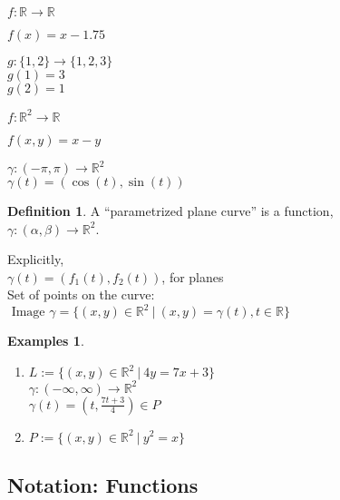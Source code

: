\documentclass[twocolumn,20pt,fleqn]{extarticle}
\newcommand{\sep}{\vspace{0.5cm}}
\theoremstyle{plain}
\theoremstyle{definition}
\newtheorem*{definition}{Definition}
\newtheorem*{exmpls}{Examples}
\theoremstyle{remark}
\newenvironment*{examples}{\begin{exmpls} ~ \begin{enumerate}}{\end{enumerate}\end{exmpls}}
\begin{document}
$ f: \mathbb{R}  \to \mathbb{R}$

$f(x) = x - 1.75$\\

\sep

  $g : \{1,2\} \to \{1,2,3\}$\\
    $g(1) = 3$\\
    $g(2) = 1$\\

\sep

$ f: \mathbb{R}^2  \to \mathbb{R}$

$f(  x,y  ) = x - y$


\sep

$\gamma :  (-\pi,\pi)  \to \mathbb{R}^2$\\
$\gamma(t) = (\cos(t), \sin(t))$



\newpage



\begin{definition}
  A  ``parametrized plane curve''  is a  function,\\ $\gamma  : (\alpha, \beta) \to \mathbb{R}^2$.
\end{definition}

Explicitly,\\
$\gamma(t) = (f_1(t), f_2(t))$, for planes\\

Set of points on the curve:\\  $\textrm{ Image } \gamma = \{(x,y) \in \mathbb{R}^2 \ |\ (x,y) = \gamma(t), t \in \mathbb{R}\}$




\begin{examples}
  \item $L:=\{(x,y) \in \mathbb{R}^2\ |\ 4y = 7x + 3\}$\\
  $\gamma  : (-\infty,\infty) \to \mathbb{R}^2$ \\
  $\gamma(t) = (t, \frac{7t+3}{4})  \in P$\\
  \item $P:=\{(x,y) \in \mathbb{R}^2\ |\ y^2 = x\}$\\
  \end{examples}


\clearpage




\subsection{Notation: Functions}
\end{document}
